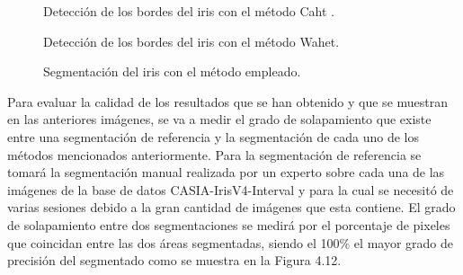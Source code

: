 \begin{figure}[htbp]
\centering
{}
\caption{Detección de los bordes del iris con el método Caht .} \label{fig:señales}
\end{figure}

\begin{figure}[htbp]
\centering
{}
\caption{Detección de los bordes del iris con el método Wahet.} \label{fig:señales}
\end{figure}


\begin{figure}[htbp]
\centering
{}
\caption{Segmentación del iris con el método empleado.} \label{fig:señales}
\end{figure}

Para evaluar la calidad de los resultados que se han obtenido y que se muestran en las anteriores imágenes, se va a medir el grado de solapamiento que existe entre una segmentación de referencia y la segmentación de cada uno de los métodos mencionados anteriormente. Para la segmentación de referencia se tomará la segmentación manual realizada por un experto sobre cada una de las imágenes de la base de datos CASIA-IrisV4-Interval y para la cual se necesitó de varias sesiones debido a la gran cantidad de imágenes que esta contiene. El grado de solapamiento entre dos segmentaciones se medirá por el porcentaje de pixeles que coincidan entre las dos áreas segmentadas, siendo el 100\% el mayor grado de precisión del segmentado como se muestra en la Figura 4.12. \\ \\ \\

